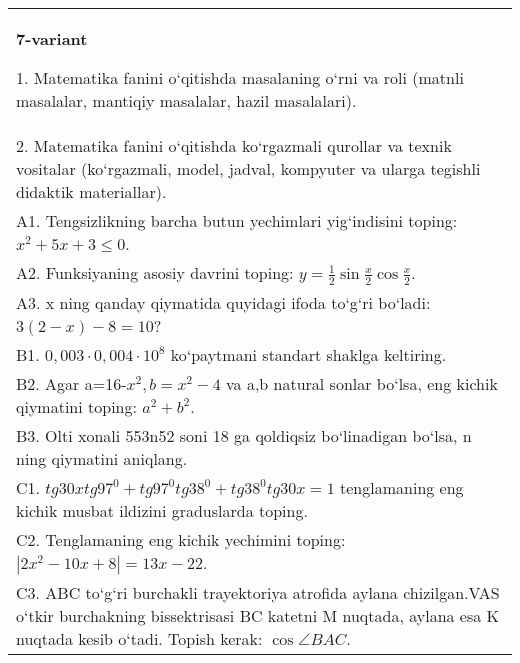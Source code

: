 \documentclass{article}
\begin{document}
\begin{tabular}{m{17cm}}
\textbf{7-variant}

1. Matematika fanini o‘qitishda masalaning o‘rni va roli (matnli masalalar, mantiqiy masalalar, hazil masalalari). \\
2. Matematika fanini o‘qitishda ko‘rgazmali qurollar va texnik vositalar (ko‘rgazmali, model, jadval, kompyuter va ularga tegishli didaktik materiallar). \\
A1. Tengsizlikning barcha butun yechimlari yig‘indisini toping: \(x^2 + 5x + 3 \leq 0\). \\
A2. Funksiyaning asosiy davrini toping: \(y = \frac{1}{2}\sin{\frac{x}{2}\cos\frac{x}{2}}\). \\
A3. x ning qanday qiymatida quyidagi ifoda to‘g‘ri bo‘ladi: \(3 (2 - x) - 8 = 10\)? \\
B1. \(0,003 \cdot 0,004 \cdot 10^{8}\) ko‘paytmani standart shaklga keltiring. \\
B2. Agar a=16-\(x^2, b=x^2-4\) va a,b natural sonlar bo‘lsa, eng kichik qiymatini toping: \(a^2 + b^2\). \\
B3. Olti xonali 553n52 soni 18 ga qoldiqsiz bo‘linadigan bo‘lsa, n ning qiymatini aniqlang. \\
C1. \(tg30xtg97^{0} + tg97^{0}tg38^{0} + tg38^{0}tg30x = 1\) tenglamaning eng kichik musbat ildizini graduslarda toping. \\
C2. Tenglamaning eng kichik yechimini toping: \(\left| 2x^2 - 10x + 8 \right| = 13x - 22\). \\
C3. ABC to‘g‘ri burchakli trayektoriya atrofida aylana chizilgan.VAS o‘tkir burchakning bissektrisasi BC katetni M nuqtada, aylana esa K nuqtada kesib o‘tadi. Topish kerak: \(\cos\angle BAC\). \\

\end{tabular}
\vspace{1cm}
\end{document}
